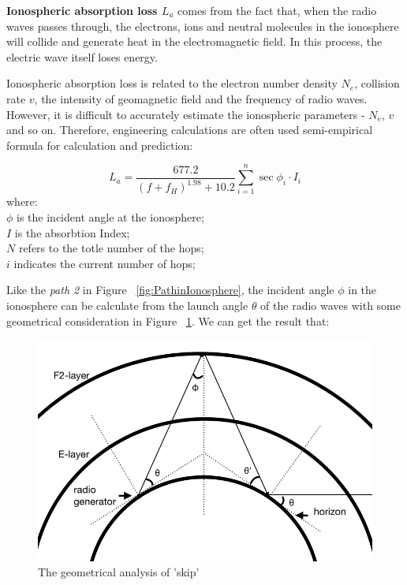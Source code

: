 \documentclass{mcmthesis}
\begin{document}
    \textbf{Ionospheric absorption loss $L_{a}$} comes from the fact that, when the radio waves passes through, the electrons, ions and neutral molecules in the ionosphere will collide and generate heat in the electromagnetic field. In this process, the electric wave itself loses energy.

    Ionospheric absorption loss is related to the electron number density $N_{e}$, collision rate $v$, the intensity of geomagnetic field and the frequency of radio waves. However, it is difficult to accurately estimate the ionospheric parameters - $N_{e}$, $v$ and so on. Therefore, engineering calculations are often used semi-empirical formula for calculation and prediction\cite{terman1943radio}:

     \begin{equation}\label{eq:IonosphereLoss}
      L_{a} = \frac{677.2}{(f + f_{H})^{1.98} + 10.2}\sum_{i = 1}^{n}\sec\phi_{i} \cdot I_{i}
     \end{equation}
     where:\\
     $\phi$ is the incident angle at the ionosphere;\\
     $I$ is the absorbtion Index;\\
     $N$ refers to the totle number of the hops;\\
     $i$ indicates the current number of hops;

    Like the \emph{path 2} in Figure ~\ref{fig:PathinIonosphere}, the incident angle $\phi$ in the ionosphere can be calculate from the launch angle $\theta$ of the radio waves with some geometrical consideration in Figure ~\ref{fig:Multi_hop_angle}. We can get the result that:

    \begin{figure}[ht]
    \centering
    \includegraphics[scale=0.3]{Multi_hop_angle}
    \caption{The geometrical analysis of 'skip' }
    \label{fig:Multi_hop_angle}
    \end{figure}
\end{document}
